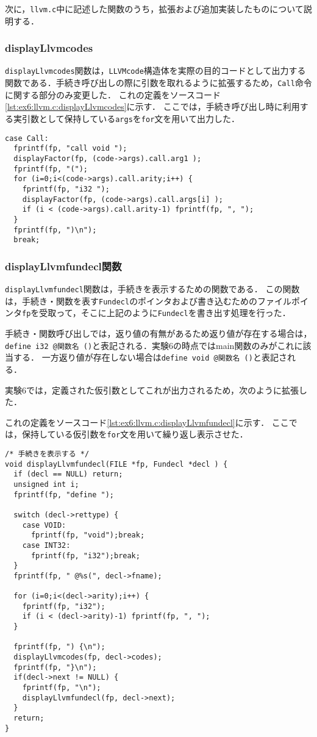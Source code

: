 \documentclass[uplatex]{jsarticle}
\begin{document}
次に，\verb#llvm.c#中に記述した関数のうち，拡張および追加実装したものについて説明する．

\subsubsection{displayLlvmcodes}
\verb#displayLlvmcodes#関数は，\verb#LLVMcode#構造体を実際の目的コードとして出力する関数である．手続き呼び出しの際に引数を取れるように拡張するため，\verb#Call#命令に関する部分のみ変更した．
これの定義をソースコード\ref{lst:ex6:llvm.c:displayLlvmcodes}に示す．
ここでは，手続き呼び出し時に利用する実引数として保持している\verb#args#を\verb#for#文を用いて出力した．
\begin{lstlisting}[caption=displayLlvmcodes関数,label=lst:ex6:llvm.c:displayLlvmcodes]
case Call:
  fprintf(fp, "call void ");
  displayFactor(fp, (code->args).call.arg1 );
  fprintf(fp, "(");
  for (i=0;i<(code->args).call.arity;i++) {
    fprintf(fp, "i32 ");
    displayFactor(fp, (code->args).call.args[i] );
    if (i < (code->args).call.arity-1) fprintf(fp, ", ");
  }
  fprintf(fp, ")\n");
  break;
\end{lstlisting}

\subsubsection{displayLlvmfundecl関数}
\verb#displayLlvmfundecl#関数は，手続きを表示するための関数である．
この関数は，手続き・関数を表す\verb#Fundecl#のポインタおよび書き込むためのファイルポインタ\verb#fp#を受取って，そこに上記のように\verb#Fundecl#を書き出す処理を行った．

手続き・関数呼び出しでは，返り値の有無があるため返り値が存在する場合は，
\verb#define i32 @関数名 ()#と表記される．実験6の時点ではmain関数のみがこれに該当する．
一方返り値が存在しない場合は\verb#define void @関数名 ()#と表記される．

実験6では，定義された仮引数としてこれが出力されるため，次のように拡張した．

これの定義をソースコード\ref{lst:ex6:llvm.c:displayLlvmfundecl}に示す．
ここでは，保持している仮引数を\verb#for#文を用いて繰り返し表示させた．

\begin{lstlisting}[caption=displayLlvmfundecl関数の定義,label=lst:ex6:llvm.c:displayLlvmfundecl]
/* 手続きを表示する */
void displayLlvmfundecl(FILE *fp, Fundecl *decl ) {
  if (decl == NULL) return;
  unsigned int i;
  fprintf(fp, "define ");

  switch (decl->rettype) {
    case VOID:
      fprintf(fp, "void");break;
    case INT32:
      fprintf(fp, "i32");break;
  }
  fprintf(fp, " @%s(", decl->fname);

  for (i=0;i<(decl->arity);i++) {
    fprintf(fp, "i32");
    if (i < (decl->arity)-1) fprintf(fp, ", ");
  }

  fprintf(fp, ") {\n");
  displayLlvmcodes(fp, decl->codes);
  fprintf(fp, "}\n");
  if(decl->next != NULL) {
    fprintf(fp, "\n");
    displayLlvmfundecl(fp, decl->next);
  }
  return;
}
\end{lstlisting}
\end{document}

